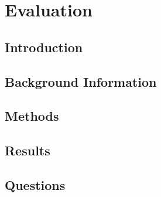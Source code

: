 






\maketitle
\abstract{} \label{sec:abstract}
\thispagestyle{fancy} %


\section{Evaluation} \label{sec:evaluation}


\subsection{Introduction} \label{sub:introduction}


\subsection{Background Information} \label{sub:background}


\subsection{Methods} \label{sub:methods}


\subsection{Results} \label{sub:results}


\subsection{Questions} \label{sub:questions1}


